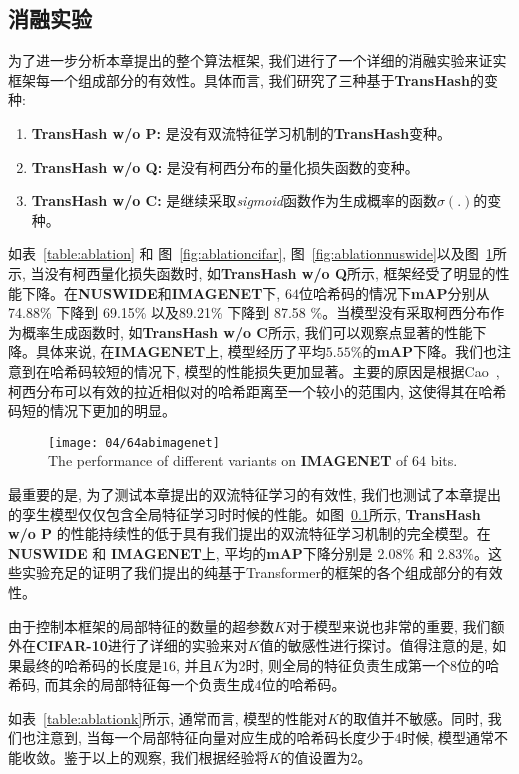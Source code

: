\subsection{消融实验}
为了进一步分析本章提出的整个算法框架, 我们进行了一个详细的消融实验来证实框架每一个组成部分的有效性。具体而言, 我们研究了三种基于\textbf{TransHash}的变种:
\begin{enumerate}
    \item \textbf{TransHash w/o P:} 是没有双流特征学习机制的\textbf{TransHash}变种。
    \item \textbf{TransHash w/o Q:} 是没有柯西分布的量化损失函数的变种。
    \item \textbf{TransHash w/o C:} 是继续采取\textit{sigmoid}函数作为生成概率的函数$\sigma(.)$的变种。
\end{enumerate}
如表~\ref{table:ablation} 和 图~\ref{fig:ablationcifar}, 图~\ref{fig:ablationnuswide}以及图~\ref{fig:ablationimagenet}所示, 当没有柯西量化损失函数时, 如\textbf{TransHash w/o Q}所示, 框架经受了明显的性能下降。在\textbf{NUSWIDE}和\textbf{IMAGENET}下, $64$位哈希码的情况下\textbf{mAP}分别从 74.88\% 下降到 69.15\% 以及89.21\% 下降到 87.58 \%。当模型没有采取柯西分布作为概率生成函数时, 如\textbf{TransHash w/o C}所示, 我们可以观察点显著的性能下降。具体来说, 在\textbf{IMAGENET}上, 模型经历了平均$5.55 \%$的\textbf{mAP}下降。我们也注意到在哈希码较短的情况下, 模型的性能损失更加显著。主要的原因是根据Cao~\cite{cao2018deep}, 柯西分布可以有效的拉近相似对的哈希距离至一个较小的范围内, 这使得其在哈希码短的情况下更加的明显。\par

\begin{figure}[!htp]
    \centering
    \texttt{[image: 04/64abimagenet]} \\
      {The performance of different variants on \textbf{IMAGENET} of $64$ bits.}
   \label{fig:ablationimagenet}
\end{figure}


最重要的是, 为了测试本章提出的双流特征学习的有效性, 我们也测试了本章提出的孪生模型仅仅包含全局特征学习时时候的性能。如图~\ref{}所示,  \textbf{TransHash w/o P} 的性能持续性的低于具有我们提出的双流特征学习机制的完全模型。在\textbf{NUSWIDE} 和 \textbf{IMAGENET}上, 平均的\textbf{mAP}下降分别是  2.08\% 和 2.83\%。这些实验充足的证明了我们提出的纯基于Transformer的框架的各个组成部分的有效性。\par
由于控制本框架的局部特征的数量的超参数$K$对于模型来说也非常的重要, 我们额外在\textbf{CIFAR-10}进行了详细的实验来对$K$值的敏感性进行探讨。值得注意的是, 如果最终的哈希码的长度是$16$, 并且$K$为2时, 则全局的特征负责生成第一个$8$位的哈希码, 而其余的局部特征每一个负责生成$4$位的哈希码。 \par
如表~\ref{table:ablationk}所示, 通常而言, 模型的性能对$K$的取值并不敏感。同时, 我们也注意到, 当每一个局部特征向量对应生成的哈希码长度少于$4$时候, 模型通常不能收敛。鉴于以上的观察, 我们根据经验将$K$的值设置为$2$。

